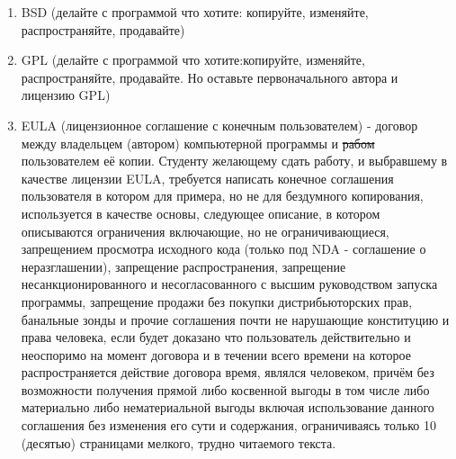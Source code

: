 \documentclass[unicode, 12pt, a4paper,oneside,fleqn]{article}
\begin{document}
\begin{enumerate}
\begin{enumerate}
\item BSD (делайте с программой что хотите: копируйте,
    изменяйте, распространяйте, продавайте)
\item GPL (делайте с программой что хотите:копируйте,
    изменяйте, распространяйте, продавайте. Но оставьте
    первоначального автора и лицензию GPL)
\item EULA (лицензионное соглашение с конечным пользователем) -
  договор между владельцем (автором) компьютерной программы и
 \sout{рабом} пользователем её копии. 
  {\tiny Студенту желающему сдать работу, и выбравшему в качестве
    лицензии EULA, требуется написать конечное соглашения пользователя
    в котором для примера, но не для бездумного копирования,
    используется в качестве основы, следующее описание, в котором
    описываются ограничения включающие, но не ограничивающиеся,
    запрещением просмотра исходного кода (только под NDA - соглашение
    о неразглашении), запрещение распространения, запрещение
    несанкционированного и несогласованного с высшим руководством
    запуска программы, запрещение продажи без покупки дистрибьюторских
    прав, банальные зонды и прочие соглашения почти не нарушающие
    конституцию и права человека, если будет доказано что пользователь
    действительно и неоспоримо на момент договора и в течении всего времени на
    которое распространяется действие договора время, являлся
    человеком, причём без возможности получения прямой либо косвенной выгоды
    в том числе либо материально либо нематериальной выгоды включая
    использование данного соглашения без изменения его сути и содержания,
    ограничиваясь только 10 (десятью) страницами мелкого, трудно
    читаемого текста.}
  {\tiny }
\end{enumerate}




\end{enumerate}


\newpage
\end{document}
